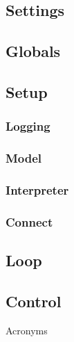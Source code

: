 \documentclass[aspectratio=169]{beamer}
\begin{document}
\subsection{Settings}

\subsection{Globals}

\subsection{Setup}
\subsubsection{Logging}

\subsubsection{Model}

\subsubsection{Interpreter}

\subsubsection{Connect}

\subsection{Loop}

\subsection{Control}


\appendix

\begin{frame}[allowframebreaks]{Acronyms}
    \printglossary[type=\acronymtype, nonumberlist]
\end{frame}

%     
\end{document}
